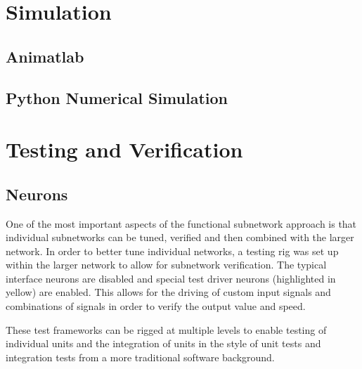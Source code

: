 \section{Simulation}

\subsection{Animatlab}

\subsection{Python Numerical Simulation}

\section{Testing and Verification}

\subsection{Neurons}

One of the most important aspects of the functional subnetwork approach is that
individual subnetworks can be tuned, verified and then combined with the larger
network. In order to better tune individual networks, a testing rig was set up
within the larger network to allow for subnetwork verification. The typical
interface neurons are disabled and special test driver neurons (highlighted in
yellow) are enabled. This allows for the driving of custom input signals and
combinations of signals in order to verify the output value and speed.


These test frameworks can be rigged at multiple levels to enable testing of
individual units and the integration of units in the style of unit tests and
integration tests from a more traditional software background.


